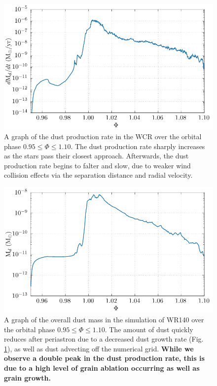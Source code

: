 \documentclass[fleqn,usenatbib]{mnras}
\begin{document}
\begin{figure}
  \centering
  \includegraphics[width=\linewidth]{assets/wr140-dust_rate.pdf}
  \caption[A graph of the dust production rate in the WCR over the orbital phase $0.95 \leq \Phi \leq 1.10$]{A graph of the dust production rate in the WCR over the orbital phase $0.95 \leq \Phi \leq 1.10$. The dust production rate sharply increases as the stars pass their closest approach. Afterwards, the dust production rate begins to falter and slow, due to weaker wind collision effects via the separation distance and radial velocity.}
  \label{fig:wr140-dustproduction}
\end{figure}

\begin{figure}
  \centering
  \includegraphics[width=\linewidth]{assets/wr140-m_dust.pdf}
  \caption[A graph of the overall dust mass in the simulation of WR140 over the orbital phase $0.95 \leq \Phi \leq 1.10$]{A graph of the overall dust mass in the simulation of WR140 over the orbital phase $0.95 \leq \Phi \leq 1.10$. The amount of dust quickly reduces after periastron due to a decreased dust growth rate (Fig. \ref{fig:wr140-dustproduction}), as well as dust advecting off the numerical grid. \textbf{While we observe a double peak in the dust production rate, this is due to a high level of grain ablation occurring as well as grain growth.}}
  \label{fig:wr140-dustmass}
\end{figure}
\end{document}
